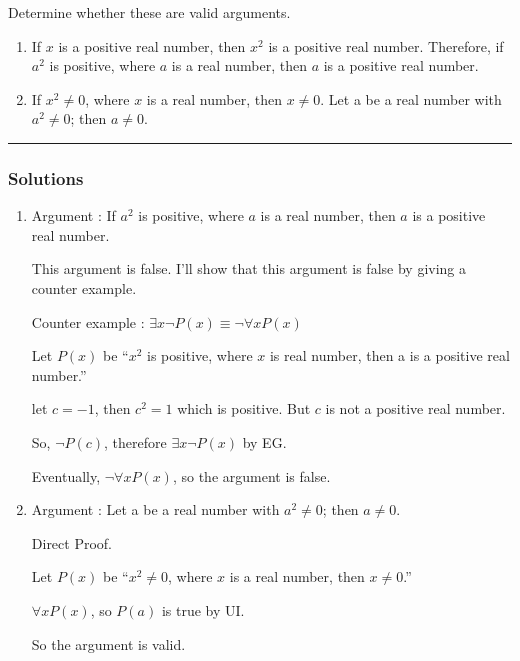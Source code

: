 \newpage
\begin{question}
Determine whether these are valid arguments.
\begin{enumerate}
\item If $x$ is a positive real number, then $x^2$ is a positive real
number. Therefore, if $a^2$ is positive, where $a$ is a real
number, then $a$ is a positive real number.
\item If $x^2\ne0$, where $x$ is a real number, then $x\ne0$. Let a
be a real number with $a^2\ne0$; then $a\ne0$.
\end{enumerate}
\end{question}

\par\noindent\rule{\textwidth}{0.5pt}

\subsubsection*{Solutions}
\begin{enumerate}
    \item Argument : If $a^2$ is positive, where $a$ is a real number, then $a$ is a positive real number.
    
    This argument is false. I'll show that this argument is false by giving a counter example.

    Counter example : $\exists x \neg P(x) \equiv \neg \forall x P(x)$

    Let $P(x)$ be ``$x^2$ is positive, where $x$ is real number, then a is a positive real number.''

    let $c = -1$, then $c^2 = 1$ which is positive. But $c$ is not a positive real number. 

    So, $\neg P(c)$, therefore $\exists x \neg P(x)$ by EG.

    Eventually, $\neg \forall x P(x)$, so the argument is false.

    \bigskip


    \item Argument : Let a be a real number with $a^2\ne0$; then $a\ne0$.

    Direct Proof.

    Let $P(x)$ be ``$x^2\ne0$, where $x$ is a real number, then $x\ne0$.''

    $\forall xP(x)$, so $P(a)$ is true by UI.

    So the argument is valid.

    
\end {enumerate}